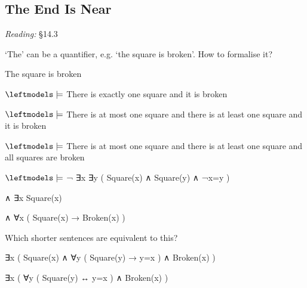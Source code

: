 \documentclass[12pt]{extarticle}
\begin{document}
\begin{multicols*}{3}
  
 
 
\section{The End Is Near}
 
\emph{Reading:} §14.3
 
‘The’ can be a quantifier, e.g. ‘the square is broken’. How to formalise it?
 
The square is broken
 
$\leftmodels\models$ There is exactly one square and it is broken
 
$\leftmodels\models$ There is at most one square and there is at least one square and it is broken
 
$\leftmodels\models$ There is at most one square and there is at least one square and all squares are broken
 
$\leftmodels\models$ ¬ ∃x ∃y ( Square(x) ∧ Square(y) ∧ ¬x=y )
 
\hspace{5mm} ∧ ∃x Square(x)
 
\hspace{5mm} ∧ ∀x ( Square(x) → Broken(x) )
 
Which shorter sentences are equivalent to this?
 
∃x ( Square(x) ∧ ∀y ( Square(y) → y=x ) ∧ Broken(x) )
 
∃x ( ∀y ( Square(y) ↔ y=x ) ∧ Broken(x) )
 
 


\end{multicols*}
\end{document}
